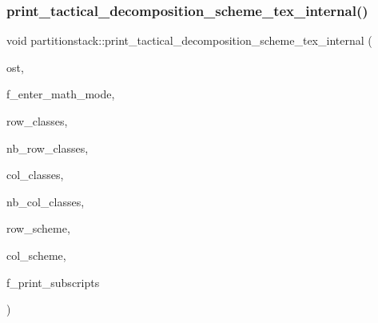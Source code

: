 \mbox{\label{classpartitionstack_aa79ebae6c167b8517972eb5490298856}} 
\subsubsection{\texorpdfstring{print\+\_\+tactical\+\_\+decomposition\+\_\+scheme\+\_\+tex\+\_\+internal()}{print\_tactical\_decomposition\_scheme\_tex\_internal()}}
{\footnotesize\ttfamily void partitionstack\+::print\+\_\+tactical\+\_\+decomposition\+\_\+scheme\+\_\+tex\+\_\+internal (\begin{DoxyParamCaption}\item[{ostream \&}]{ost,  }\item[{\mbox{\hyperlink{galois_8h_a09fddde158a3a20bd2dcadb609de11dc}{I\+NT}}}]{f\+\_\+enter\+\_\+math\+\_\+mode,  }\item[{\mbox{\hyperlink{galois_8h_a09fddde158a3a20bd2dcadb609de11dc}{I\+NT}} $\ast$}]{row\+\_\+classes,  }\item[{\mbox{\hyperlink{galois_8h_a09fddde158a3a20bd2dcadb609de11dc}{I\+NT}}}]{nb\+\_\+row\+\_\+classes,  }\item[{\mbox{\hyperlink{galois_8h_a09fddde158a3a20bd2dcadb609de11dc}{I\+NT}} $\ast$}]{col\+\_\+classes,  }\item[{\mbox{\hyperlink{galois_8h_a09fddde158a3a20bd2dcadb609de11dc}{I\+NT}}}]{nb\+\_\+col\+\_\+classes,  }\item[{\mbox{\hyperlink{galois_8h_a09fddde158a3a20bd2dcadb609de11dc}{I\+NT}} $\ast$}]{row\+\_\+scheme,  }\item[{\mbox{\hyperlink{galois_8h_a09fddde158a3a20bd2dcadb609de11dc}{I\+NT}} $\ast$}]{col\+\_\+scheme,  }\item[{\mbox{\hyperlink{galois_8h_a09fddde158a3a20bd2dcadb609de11dc}{I\+NT}}}]{f\+\_\+print\+\_\+subscripts }\end{DoxyParamCaption})}

\mbox{\label{classpartitionstack_a9ab564e8289467768e46fea7d6f8711e}} 
